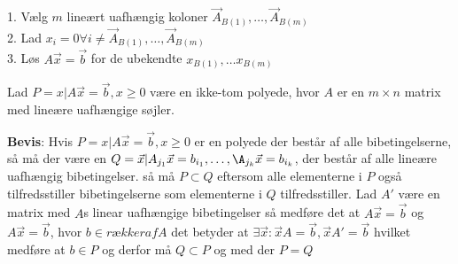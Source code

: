 %
\begin{alg}
1. Vælg $m$ lineært uafhængig koloner $\vec{A}_{B(1)},\dots,\vec{A}_{B(m)}$\\
2. Lad $x_i=0\forall i\neq\vec{A}_{B(1)},\dots,\vec{A}_{B(m)}$\\
3. Løs $A\vec{x}=\vec{b}$ for de ubekendte $x_{B(1)},\dots x_{B(m)}$
\end{alg}

\begin{stn}
Lad $P=x|A\vec{x}=\vec{b},x\geq 0$ være en ikke-tom polyede, hvor $A$ er en $m\times n$ matrix med lineære uafhængige søjler.\\
\end{stn}
\textbf{Bevis}:
Hvis $P=x|A\vec{x}=\vec{b},x\geq 0$ er en polyede der består af alle bibetingelserne, så må der være en $Q=\vec{x}|A_{j_1}\vec{x}=b_{i_1},\dots,\A_{j_k}\vec{x}=b_{i_k}$, der består af alle lineære uafhængig bibetingelser. så må $P\subset Q$ eftersom alle elementerne i $P$ også tilfredsstiller bibetingelserne som elementerne i $Q$ tilfredsstiller.
Lad $A'$ være en matrix med $A$s linear uafhængige bibetingelser så medføre det at $A\vec{x}=\vec{b}$ og $A\vec{x}=\vec{b}$, hvor $b\in {rækker af A}$ det betyder at $\exists \vec{x}:\vec{x}A=\vec{b}, \vec{x}A'=\vec{b}$ hvilket medføre at $b\in P$ og derfor må $Q\subset P$ og med der $P=Q$